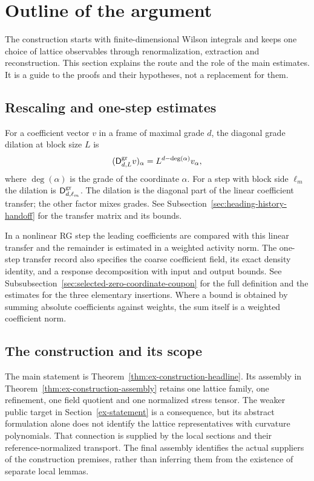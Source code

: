 \section{Outline of the argument}
\label{ex-outline}

The construction starts with finite-dimensional Wilson integrals and keeps
one choice of lattice observables through renormalization, extraction and
reconstruction. This section explains the route and the role of the main
estimates. It is a guide to the proofs and their hypotheses, not a
replacement for them.

\subsection{Rescaling and one-step estimates}
\label{sec:ex-rg-terminology}

For a coefficient vector $v$ in a frame of maximal grade $d$, the
diagonal grade dilation at block size $L$ is
\[
 (\mathsf D^{\rm gr}_{d,L} v)_\alpha=L^{d-\deg(\alpha)}v_\alpha,
\]
where $\deg(\alpha)$ is the grade of the coordinate $\alpha$. For a step
with block side $\ell_m$ the dilation is $\mathsf D^{\rm gr}_{d,\ell_m}$.
The dilation is the diagonal part of the linear coefficient transfer;
the other factor mixes grades. See Subsection~\ref{sec:heading-history-handoff}
for the transfer matrix and its bounds.

In a nonlinear RG step the leading coefficients are compared with this
linear transfer and the remainder is estimated in a weighted activity norm.
The one-step transfer record also specifies the coarse coefficient field,
its exact density identity, and a response decomposition with input and
output bounds. See Subsubsection~\ref{sec:selected-zero-coordinate-coupon}
for the full definition and the estimates for the three elementary
insertions. Where a bound is obtained by summing absolute coefficients
against weights, the sum itself is a weighted coefficient norm.

\subsection{The construction and its scope}
\label{ex-outline-status}

The main statement is Theorem~\ref{thm:ex-construction-headline}.
Its assembly in Theorem~\ref{thm:ex-construction-assembly} retains
one lattice family, one refinement, one field quotient and one normalized
stress tensor. The weaker public target in Section~\ref{ex-statement}
is a consequence, but its abstract formulation alone does not identify
the lattice representatives with curvature polynomials. That connection
is supplied by the local sections and their reference-normalized transport.
The final assembly identifies the actual suppliers of the construction
premises, rather than inferring them from the existence of separate local
lemmas.

